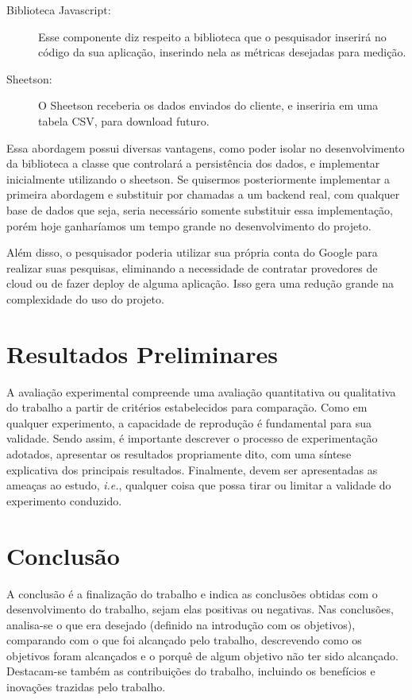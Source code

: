 \documentclass[12pt]{tcc}
\begin{document}
\begin{description}
	\item[Biblioteca Javascript:] Esse componente diz respeito a biblioteca que o pesquisador inserirá no código da sua aplicação, inserindo nela as métricas desejadas para medição.
	
	\item[Sheetson:] O Sheetson receberia os dados enviados do cliente, e inseriria em uma tabela CSV, para download futuro.

\end{description}

Essa abordagem possui diversas vantagens, como poder isolar no desenvolvimento da biblioteca a classe que controlará a persistência dos dados, e implementar inicialmente utilizando o sheetson. Se quisermos posteriormente implementar a primeira abordagem e substituir por chamadas a um backend real, com qualquer base de dados que seja, seria necessário somente substituir essa implementação, porém hoje ganharíamos um tempo grande no desenvolvimento do projeto.

Além disso, o pesquisador poderia utilizar sua própria conta do Google para realizar suas pesquisas, eliminando a necessidade de contratar provedores de cloud ou de fazer deploy de alguma aplicação. Isso gera uma redução grande na complexidade do uso do projeto.


\chapter{Resultados Preliminares}
\label{sec:resul_preliminares}

A avaliação experimental compreende uma avaliação quantitativa ou qualitativa do trabalho a partir de critérios estabelecidos para comparação. Como em qualquer experimento, a capacidade de reprodução é fundamental para sua validade. Sendo assim, é importante descrever o processo de experimentação adotados, apresentar os resultados propriamente dito, com uma síntese explicativa dos principais resultados. Finalmente, devem ser apresentadas as ameaças ao estudo, \emph{i.e.}, qualquer coisa que possa tirar ou limitar a validade do experimento conduzido. 

\chapter{Conclusão}
	\label{sec:conclusao}

	A conclusão é a finalização do trabalho e indica as conclusões obtidas com o desenvolvimento do trabalho, sejam elas positivas ou negativas. Nas conclusões, analisa-se o que era desejado (definido na introdução com os objetivos), comparando com o que foi alcançado pelo trabalho, descrevendo como os objetivos foram alcançados e o porquê de algum objetivo não ter sido alcançado. Destacam-se também as contribuições do trabalho, incluindo os benefícios e inovações trazidas pelo trabalho.
\end{document}
